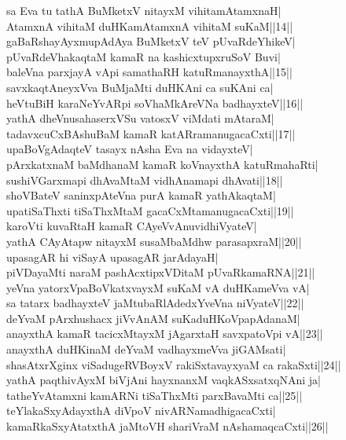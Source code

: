 \documentclass{article}
\begin{document}
sa Eva tu tathA BuMketxV nitayxM vihitamAtamxnaH|\\
AtamxnA vihitaM duHKamAtamxnA vihitaM suKaM||14||\\
gaBaRshayAyxmupAdAya BuMketxV teV pUvaRdeYhikeV|\\
pUvaRdeVhakaqtaM kamaR na kashicxtupxruSoV Buvi|\\
baleVna parxjayA vApi samathaRH katuRmanayxthA||15||\\
savxkaqtAneyxVva BuMjaMti duHKAni ca suKAni ca|\\
heVtuBiH karaNeYvARpi soVhaMkAreVNa badhayxteV||16||\\
yathA dheVnusahaserxVSu vatosxV viMdati mAtaraM|\\
tadavxcuCxBAshuBaM kamaR katARramanugacaCxti||17||\\
upaBoVgAdaqteV tasayx nAsha Eva na vidayxteV|\\
pArxkatxnaM baMdhanaM kamaR koVnayxthA katuRmahaRti|\\
sushiVGarxmapi dhAvaMtaM vidhAnamapi dhAvati||18||\\
shoVBateV saninxpAteVna purA kamaR yathAkaqtaM|\\
upatiSaThxti tiSaThxMtaM gacaCxMtamanugacaCxti||19||\\
karoVti kuvaRtaH kamaR CAyeVvAnuvidhiVyateV|\\
yathA CAyAtapw nitayxM susaMbaMdhw parasapxraM||20||\\
upasagAR hi viSayA upasagAR jarAdayaH|\\
piVDayaMti naraM pashAcxtipxVDitaM pUvaRkamaRNA||21||\\
yeVna yatorxVpaBoVkatxvayxM suKaM vA duHKameVva vA|\\
sa tatarx badhayxteV jaMtubaRlAdedxYveVna niVyateV||22||\\
deYvaM pArxhushacx jiVvAnAM suKaduHKoVpapAdanaM|\\
anayxthA kamaR tacicxMtayxM jAgarxtaH savxpatoVpi vA||23||\\
anayxthA duHKinaM deYvaM vadhayxmeVva jiGAMsati|\\
shasAtxrXginx viSadugeRVBoyxV rakiSxtavayxyaM ca rakaSxti||24||\\
yathA paqthivAyxM biVjAni hayxnanxM vaqkASxsatxqNAni ja|\\
tatheYvAtamxni kamARNi tiSaThxMti parxBavaMti ca||25||\\
teYlakaSxyAdayxthA diVpoV nivARNamadhigacaCxti|\\
kamaRkaSxyAtatxthA jaMtoVH shariVraM nAshamaqcaCxti||26||\\
\end{document}
